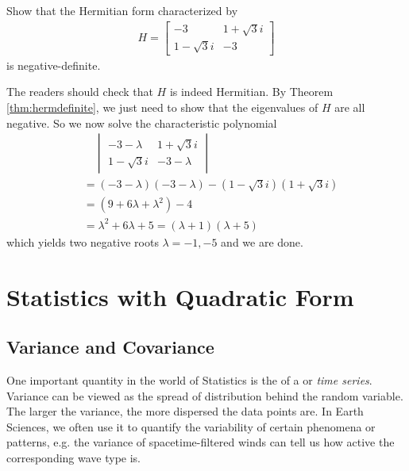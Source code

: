\begin{exmp}
Show that the Hermitian form characterized by
\begin{align*}
H =
\begin{bmatrix}
-3 & 1+\sqrt{3}i\\ 
1-\sqrt{3}i & -3
\end{bmatrix}
\end{align*}
is negative-definite.
\end{exmp}
\begin{solution}
The readers should check that $H$ is indeed Hermitian. By Theorem \ref{thm:hermdefinite}, we just need to show that the eigenvalues of $H$ are all negative. So we now solve the characteristic polynomial
\begin{align*}
&\quad \begin{vmatrix}
-3-\lambda & 1+\sqrt{3}i\\ 
1-\sqrt{3}i & -3-\lambda
\end{vmatrix} \\
&= (-3-\lambda)(-3-\lambda) - (1-\sqrt{3}i)(1+\sqrt{3}i) \\
&= (9 + 6\lambda + \lambda^2) - 4 \\
&= \lambda^2 + 6\lambda + 5 = (\lambda + 1)(\lambda + 5)
\end{align*}
which yields two negative roots $\lambda = -1, -5$ and we are done.
\end{solution}

\section{Statistics with Quadratic Form}

\subsection{Variance and Covariance}
\label{section:variancesec}
One important quantity in the world of Statistics is the  of a  or \textit{time series}. Variance can be viewed as the spread of distribution behind the random variable. The larger the variance, the more dispersed the data points are. In Earth Sciences, we often use it to quantify the variability of certain phenomena or patterns, e.g. the variance of spacetime-filtered winds can tell us how active the corresponding wave type is.


